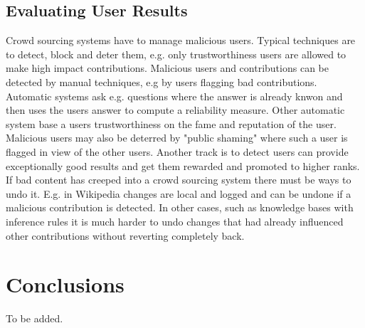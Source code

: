 \documentclass{sig-alternate}
\begin{document}
\subsection{Evaluating User Results}
Crowd sourcing systems have to manage malicious users. Typical techniques are to detect, block and deter them, e.g. only trustworthiness users are allowed to make high impact contributions. Malicious users and contributions can be detected by manual techniques, e.g by users flagging bad contributions. Automatic systems ask e.g. questions where the answer is already knwon and then uses the users answer to compute a reliability measure. Other automatic system base a users trustworthiness on the fame and reputation of the user. Malicious users may also be deterred by "public shaming" where such a user is flagged in view of the other users. Another track is to detect users can provide exceptionally good results and get them rewarded and promoted to higher ranks.
\newline\newline
If bad content has creeped into a crowd sourcing system there must be ways to undo it. E.g. in Wikipedia changes are local and logged and can be undone if a malicious contribution is detected. In other cases, such as knowledge bases with inference rules it is much harder to undo changes that had already influenced other contributions without reverting completely back.



\section{Conclusions}
To be added.

%

%
%
\end{document}
